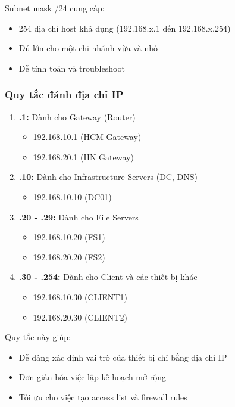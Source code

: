 Subnet mask /24 cung cấp:
\begin{itemize}
    \item 254 địa chỉ host khả dụng (192.168.x.1 đến 192.168.x.254)
    \item Đủ lớn cho một chi nhánh vừa và nhỏ
    \item Dễ tính toán và troubleshoot
\end{itemize}

\subsubsection{Quy tắc đánh địa chỉ IP}

\begin{enumerate}
    \item \textbf{.1:} Dành cho Gateway (Router)
    \begin{itemize}
        \item 192.168.10.1 (HCM Gateway)
        \item 192.168.20.1 (HN Gateway)
    \end{itemize}
    
    \item \textbf{.10:} Dành cho Infrastructure Servers (DC, DNS)
    \begin{itemize}
        \item 192.168.10.10 (DC01)
    \end{itemize}
    
    \item \textbf{.20 - .29:} Dành cho File Servers
    \begin{itemize}
        \item 192.168.10.20 (FS1)
        \item 192.168.20.20 (FS2)
    \end{itemize}
    
    \item \textbf{.30 - .254:} Dành cho Client và các thiết bị khác
    \begin{itemize}
        \item 192.168.10.30 (CLIENT1)
        \item 192.168.20.30 (CLIENT2)
    \end{itemize}
\end{enumerate}

Quy tắc này giúp:
\begin{itemize}
    \item Dễ dàng xác định vai trò của thiết bị chỉ bằng địa chỉ IP
    \item Đơn giản hóa việc lập kế hoạch mở rộng
    \item Tối ưu cho việc tạo access list và firewall rules
\end{itemize}


